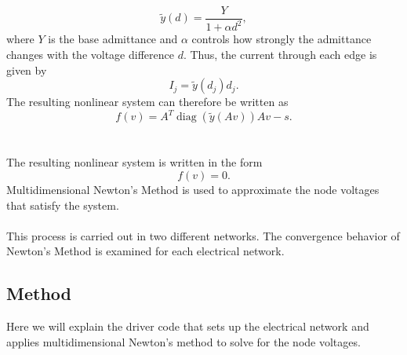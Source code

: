 \documentclass[12pt]{article}
\begin{document}
$$
\widetilde{y}(d)=\frac{Y}{1+\alpha d^2},
$$
where \(Y\) is the base admittance and \(\alpha\) controls how strongly the admittance changes with the voltage difference \(d\). Thus, the current through each edge is given by
$$
I_j=\widetilde{y}(d_j)d_j.
$$
The resulting nonlinear system can therefore be written as
$$
f(v)=A^T\operatorname{diag}(\widetilde{y}(Av))Av-s.
$$
\\\\ 
The resulting nonlinear system is written in the form \begin{equation}f(v) = 0.
\end{equation} Multidimensional Newton's Method is used to approximate the node voltages that satisfy the system. \\\\
This process is carried out in two different networks. The convergence behavior of Newton's Method is examined for each electrical network. 

\subsection{Method}
Here we will explain the driver code that sets up the electrical network and applies multidimensional Newton's method to solve for the node voltages.
\end{document}
